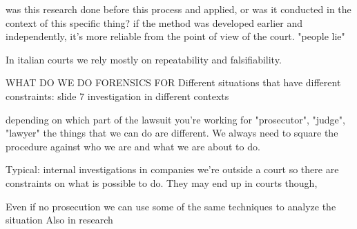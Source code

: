             was this research done before this process and applied, or was it conducted in the context of this specific thing?
            if the method was developed earlier and independently, it's more reliable from the point of view of the court. "people lie"

        In italian courts we rely mostly on repeatability and falsifiability.

    WHAT DO WE DO FORENSICS FOR
        Different situations that have different constraints:
        slide 7
        investigation in different contexts 

        depending on which part of the lawsuit you're working for "prosecutor", "judge", "lawyer"
        the things that we can do are different. We always need to square the procedure against who we are and what we are about to do.

        Typical: internal investigations in companies we're outside a court so there are constraints on what is possible to do. They may end up in courts though,

        Even if no prosecution we can use some of the same techniques to analyze the situation
        Also in research 
        
                    
\fi